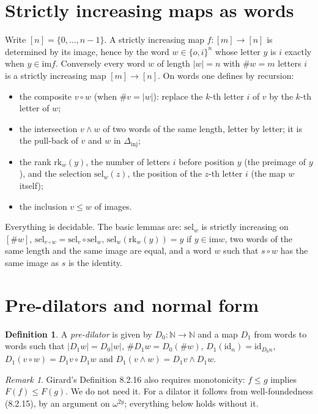 \documentclass[11pt,a4paper]{article}
\theoremstyle{definition}
\newtheorem{definition}[theorem]{Definition}
\theoremstyle{remark}
\newtheorem{remark}[theorem]{Remark}
\newcommand{\Dinj}{\Delta_{\mathrm{inj}}}
\newcommand{\rk}{\mathrm{rk}}
\newcommand{\sel}{\mathrm{sel}}
\newcommand{\im}{\mathrm{im}}
\newcommand{\id}{\mathrm{id}}
\newcommand{\N}{\mathbb{N}}
\begin{document}
\section{Strictly increasing maps as words}

Write $[n] = \{0, \dots, n-1\}$. A strictly increasing map
$f : [m] \to [n]$ is determined by its image, hence by the word
$w \in \{o,i\}^n$ whose letter $y$ is $i$ exactly when $y \in \im f$.
Conversely every word $w$ of length $|w| = n$ with $\#w = m$ letters $i$
is a strictly increasing map $[m] \to [n]$. On words one defines by
recursion:
\begin{itemize}
\item the composite $v \circ w$ (when $\#v = |w|$): replace the $k$-th
  letter $i$ of $v$ by the $k$-th letter of $w$;
\item the intersection $v \wedge w$ of two words of the same length,
  letter by letter; it is the pull-back of $v$ and $w$ in $\Dinj$;
\item the rank $\rk_w(y)$, the number of letters $i$ before position $y$
  (the preimage of $y$), and the selection $\sel_w(z)$, the position of
  the $z$-th letter $i$ (the map $w$ itself);
\item the inclusion $v \le w$ of images.
\end{itemize}
Everything is decidable. The basic lemmas are: $\sel_w$ is strictly
increasing on $[\#w]$, $\sel_{v \circ w} = \sel_v \circ \sel_w$,
$\sel_w(\rk_w(y)) = y$ if $y \in \im w$, two words of the same length and
the same image are equal, and a word $w$ such that $s \circ w$ has the
same image as $s$ is the identity.

\section{Pre-dilators and normal form}

\begin{definition}
A \emph{pre-dilator} is given by $D_0 : \N \to \N$ and a map $D_1$ from
words to words such that $|D_1 w| = D_0 |w|$, $\#D_1 w = D_0(\#w)$,
$D_1(\id_n) = \id_{D_0 n}$, $D_1(v \circ w) = D_1 v \circ D_1 w$ and
$D_1(v \wedge w) = D_1 v \wedge D_1 w$.
\end{definition}

\begin{remark}
Girard's Definition 8.2.16 also requires monotonicity: $f \le g$ implies
$F(f) \le F(g)$. We do not need it. For a dilator it follows from
well-foundedness (8.2.15), by an argument on $\omega^{2y}$; everything
below holds without it.
\end{remark}
\end{document}
